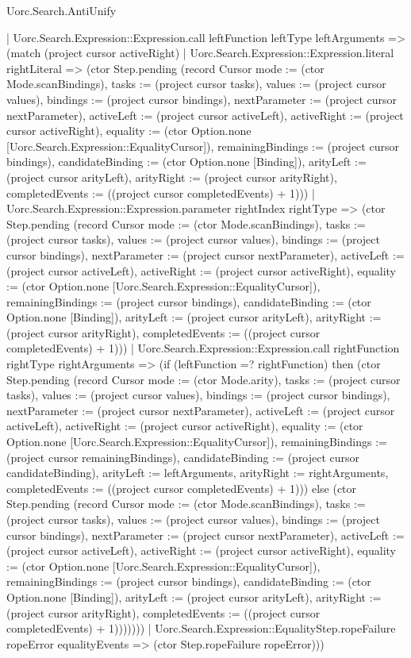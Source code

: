 \begin{lexlean}{Uorc.Search.AntiUnify}
\begin{semanticmodule}
{        | Uorc.Search.Expression::Expression.call leftFunction leftType leftArguments => (match (project cursor activeRight)
          | Uorc.Search.Expression::Expression.literal rightLiteral => (ctor Step.pending (record Cursor {mode := (ctor Mode.scanBindings), tasks := (project cursor tasks), values := (project cursor values), bindings := (project cursor bindings), nextParameter := (project cursor nextParameter), activeLeft := (project cursor activeLeft), activeRight := (project cursor activeRight), equality := (ctor Option.none [Uorc.Search.Expression::EqualityCursor]), remainingBindings := (project cursor bindings), candidateBinding := (ctor Option.none [Binding]), arityLeft := (project cursor arityLeft), arityRight := (project cursor arityRight), completedEvents := ((project cursor completedEvents) + 1)}))
          | Uorc.Search.Expression::Expression.parameter rightIndex rightType => (ctor Step.pending (record Cursor {mode := (ctor Mode.scanBindings), tasks := (project cursor tasks), values := (project cursor values), bindings := (project cursor bindings), nextParameter := (project cursor nextParameter), activeLeft := (project cursor activeLeft), activeRight := (project cursor activeRight), equality := (ctor Option.none [Uorc.Search.Expression::EqualityCursor]), remainingBindings := (project cursor bindings), candidateBinding := (ctor Option.none [Binding]), arityLeft := (project cursor arityLeft), arityRight := (project cursor arityRight), completedEvents := ((project cursor completedEvents) + 1)}))
          | Uorc.Search.Expression::Expression.call rightFunction rightType rightArguments => (if (leftFunction =? rightFunction) then (ctor Step.pending (record Cursor {mode := (ctor Mode.arity), tasks := (project cursor tasks), values := (project cursor values), bindings := (project cursor bindings), nextParameter := (project cursor nextParameter), activeLeft := (project cursor activeLeft), activeRight := (project cursor activeRight), equality := (ctor Option.none [Uorc.Search.Expression::EqualityCursor]), remainingBindings := (project cursor remainingBindings), candidateBinding := (project cursor candidateBinding), arityLeft := leftArguments, arityRight := rightArguments, completedEvents := ((project cursor completedEvents) + 1)})) else (ctor Step.pending (record Cursor {mode := (ctor Mode.scanBindings), tasks := (project cursor tasks), values := (project cursor values), bindings := (project cursor bindings), nextParameter := (project cursor nextParameter), activeLeft := (project cursor activeLeft), activeRight := (project cursor activeRight), equality := (ctor Option.none [Uorc.Search.Expression::EqualityCursor]), remainingBindings := (project cursor bindings), candidateBinding := (ctor Option.none [Binding]), arityLeft := (project cursor arityLeft), arityRight := (project cursor arityRight), completedEvents := ((project cursor completedEvents) + 1)}))))))
      | Uorc.Search.Expression::EqualityStep.ropeFailure ropeError equalityEvents => (ctor Step.ropeFailure ropeError)))
}


\end{semanticmodule}
\end{lexlean}
